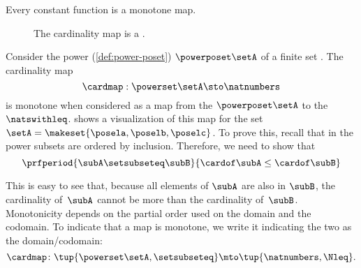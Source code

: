 \begin{example}
    Every constant function is a monotone map.
\end{example}

\begin{figure*}[b]
    \centering
    \caption{The cardinality map is a . }
    \label{fig:cardinality}
\end{figure*}

\begin{example}\label{exa:cardinality}
    Consider the power  (\cref{def:power-poset}) $\powerposet\setA$ of a finite set \setA.
    The cardinality map
    \begin{equation}\label{eq:cardinality-map}
        \cardmap : \powerset\setA \sto \natnumbers
    \end{equation}
    is monotone when considered as a map from the  $\powerposet\setA$ to the  $\natswithleq$.
     shows a visualization of this map for the set~$\setA=\makeset{\posela,\poselb,\poselc}$.
    To prove this, recall that in the power  subsets are ordered by inclusion.
    Therefore, we need to show that
    \begin{equation}\label{eq:cardinality}
        \prfperiod{
            \subA \setsubseteq \subB
        }{
            \cardof \subA \leq \cardof \subB
        }
    \end{equation}

    This is easy to see that, because all elements of $\subA$ are also in $\subB$, the cardinality of~$\subA$ cannot be more than the cardinality of~$\subB$.
    Monotonicity depends on the partial order used on the domain and the codomain.
    To indicate that a map is monotone, we write it indicating the two  as the domain/codomain:
    \begin{equation}\label{eq:cardinality-as-posmap}
        \cardmap \colon \tup{\powerset\setA, \setsubseteq} \mto \tup{\natnumbers, {{\Nleq}}}.
    \end{equation}
\end{example}

